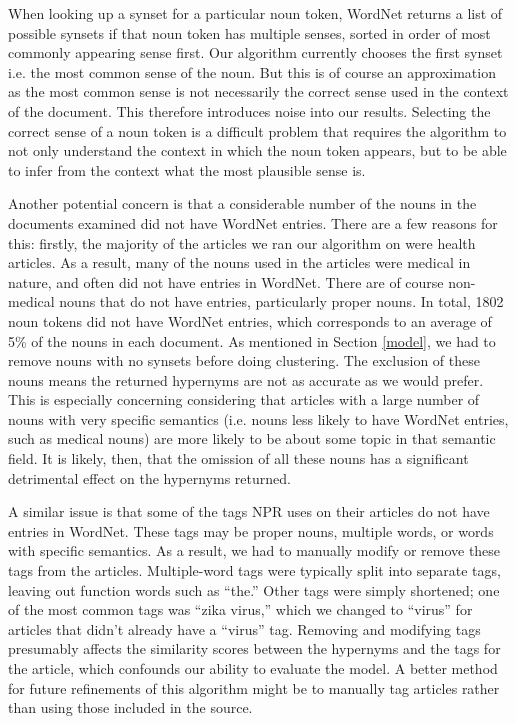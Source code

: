 \documentclass[12pt]{article}
\begin{document}
When looking up a synset for a particular noun token, WordNet returns a list of possible synsets if that noun token has multiple senses, sorted in order of most commonly appearing sense first. Our algorithm currently chooses the first synset i.e. the most common sense of the noun. But this is of course an approximation as the most common sense is not necessarily the correct sense used in the context of the document. This therefore introduces noise into our results. Selecting the correct sense of a noun token is a difficult problem that requires the algorithm to not only understand the context in which the noun token appears, but to be able to infer from the context what the most plausible sense is.

Another potential concern is that a considerable number of the nouns in the documents examined did not have WordNet entries. There are a few reasons for this: firstly, the majority of the articles we ran our algorithm on were health articles. As a result, many of the nouns used in the articles were medical in nature, and often did not have entries in WordNet. There are of course non-medical nouns that do not have entries, particularly proper nouns. In total, 1802 noun tokens did not have WordNet entries, which corresponds to an average of 5\% of the nouns in each document. As mentioned in Section \ref{model}, we had to remove nouns with no synsets before doing clustering. The exclusion of these nouns means the returned hypernyms are not as accurate as we would prefer. This is especially concerning considering that articles with a large number of nouns with very specific semantics (i.e. nouns less likely to have WordNet entries, such as medical nouns) are more likely to be about some topic in that semantic field. It is likely, then, that the omission of all these nouns has a significant detrimental effect on the hypernyms returned.

A similar issue is that some of the tags NPR uses on their articles do not have entries in WordNet. These tags may be proper nouns, multiple words, or words with specific semantics. As a result, we had to manually modify or remove these tags from the articles. Multiple-word tags were typically split into separate tags, leaving out function words such as ``the.'' Other tags were simply shortened; one of the most common tags was ``zika virus,'' which we changed to ``virus'' for articles that didn't already have a ``virus'' tag. Removing and modifying tags presumably affects the similarity scores between the hypernyms and the tags for the article, which confounds our ability to evaluate the model. A better method for future refinements of this algorithm might be to manually tag articles rather than using those included in the source.

% 
% 

\printbibliography
\end{document}
